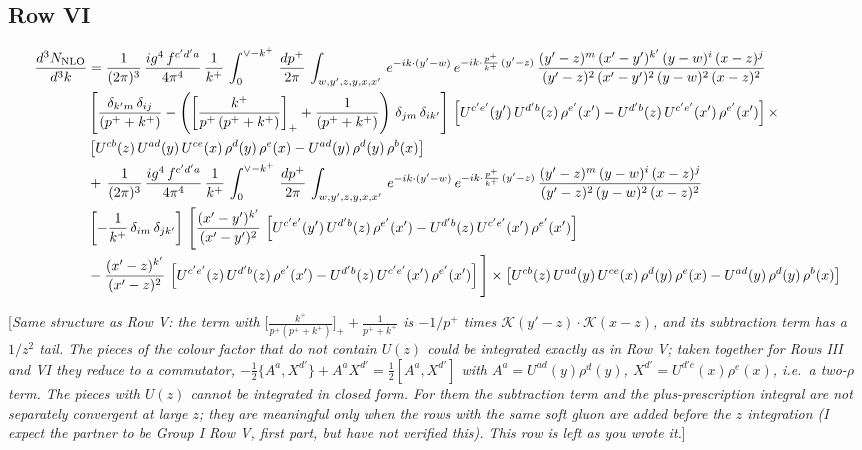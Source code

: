 \documentclass[9pt]{article}
\numberwithin{equation}{section}
\newcommand{\rnote}[1]{{\color{teal}[\textit{#1}]}}
\begin{document}
\subsection{Row VI}
\begin{align}
    \frac{d^{3}N_{\rm NLO}}{d^{3}k} & =  \frac{1}{(2\pi)^{3}}\, \frac{ig^{4}\,f^{c'd'a}}{4\pi^{4}}\, \frac{1}{k^{+}}\,\int_{0}^{\vee-k^{+}}\, \frac{dp^{+}}{2\pi}\, \int_{w,y',z,y,x,x'}\, e^{-ik\cdot (y'-w)}\, e^{-ik\cdot \frac{p^{+}}{k^{+}}\,(y'-z)}\,\frac{(y'-z)^{m}\,(x'-y')^{k'}\,(y-w)^{i}\,(x-z)^{j}}{(y'-z)^{2}\,(x'-y')^{2}\,(y-w)^{2}\,(x-z)^{2}}\notag \\ & \left[\frac{\delta_{k'm}\,\delta_{ij}}{(p^{+}+k^{+})}-\left(\left[\frac{k^{+}}{p^{+}\,(p^{+}+k^{+})}\right]_{+}+\frac{1}{(p^{+}+k^{+})}\right)\,\delta_{jm}\,\delta_{ik'}\right]\, \left[U^{c'e'}(y')\,U^{d'b}(z)\,\rho^{e'}(x')-U^{d'b}(z)\,U^{c'e'}(x')\,\rho^{e'}(x')\right]\times\notag \\ &  \left[U^{cb}(z)\,U^{ad}(y)\,U^{ce}(x)\,\rho^{d}(y)\,\rho^{e}(x)-U^{ad}(y)\,\rho^{d}(y)\,\rho^{b}(x)\right] \notag \\ &  +\,\frac{1}{(2\pi)^{3}}\, \frac{ig^{4}\,f^{c'd'a}}{4\pi^{4}}\, \frac{1}{k^{+}}\,\int_{0}^{\vee-k^{+}}\, \frac{dp^{+}}{2\pi}\, \int_{w,y',z,y,x,x'}\, e^{-ik\cdot (y'-w)}\, e^{-ik\cdot \frac{p^{+}}{k^{+}}\,(y'-z)}\,\frac{(y'-z)^{m}\,(y-w)^{i}\,(x-z)^{j}}{(y'-z)^{2}\,(y-w)^{2}\,(x-z)^{2}}\notag \\ &  \left[-\frac{1}{k^{+}}\, \delta_{im}\, \delta_{jk'}\right]\, \Bigg[\frac{(x'-y')^{k'}}{(x'-y')^{2}}\,\left[U^{c'e'}(y')\,U^{d'b}(z)\,\rho^{e'}(x')-U^{d'b}(z)\,U^{c'e'}(x')\,\rho^{e'}(x')\right]\notag \\ & -\frac{(x'-z)^{k'}}{(x'-z)^{2}}\,\left[U^{c'e'}(z)\,U^{d'b}(z)\,\rho^{e'}(x')-U^{d'b}(z)\,U^{c'e'}(x')\,\rho^{e'}(x')\right]\Bigg]\times    \left[U^{cb}(z)\,U^{ad}(y)\,U^{ce}(x)\,\rho^{d}(y)\,\rho^{e}(x)-U^{ad}(y)\,\rho^{d}(y)\,\rho^{b}(x)\right]
\end{align}

\rnote{Same structure as Row V: the term with $\big[\frac{k^{+}}{p^{+}(p^{+}+k^{+})}\big]_{+}+\frac{1}{p^{+}+k^{+}}$ is $-1/p^{+}$ times $\mathcal{K}(y'-z)\cdot\mathcal{K}(x-z)$, and its subtraction term has a $1/z^{2}$ tail. The pieces of the colour factor that do not contain $U(z)$ could be integrated exactly as in Row V; taken together for Rows III and VI they reduce to a commutator, $-\frac{1}{2}\{A^{a},X^{d'}\}+A^{a}X^{d'}=\frac{1}{2}[A^{a},X^{d'}]$ with $A^{a}=U^{ad}(y)\rho^{d}(y)$, $X^{d'}=U^{d'e}(x)\rho^{e}(x)$, i.e.\ a two-$\rho$ term. The pieces with $U(z)$ cannot be integrated in closed form. For them the subtraction term and the plus-prescription integral are not separately convergent at large $z$; they are meaningful only when the rows with the same soft gluon are added before the $z$ integration (I expect the partner to be Group I Row V, first part, but have not verified this). This row is left as you wrote it.}
\end{document}
